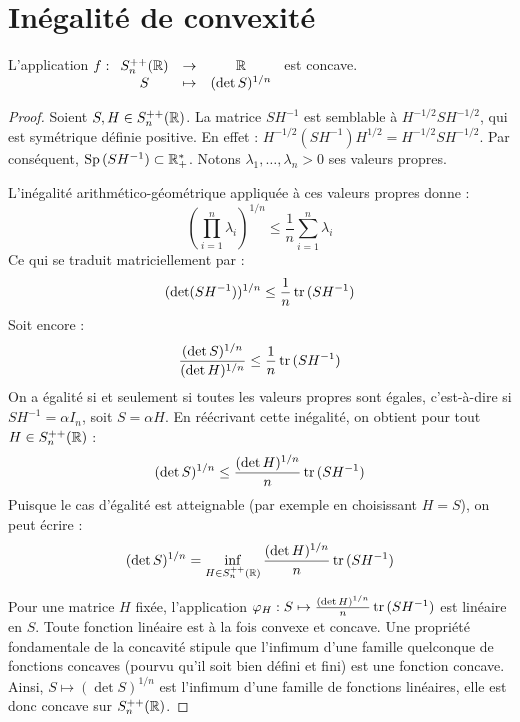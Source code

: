 \section{Inégalité de convexité}

\begin{proposition}{}{}
    L'application $f : \begin{array}[t]{ccc}
    S_n^{++}(\mathbb{R}) & \to & \mathbb{R} \\
    S & \mapsto & (\det S)^{1/n}
    \end{array}$ est concave.
\end{proposition}

\lvspace \avspace {}
\begin{proof}
    Soient $S, H \in S_n^{++}(\mathbb{R})$.
    La matrice $S H^{-1}$ est semblable à $H^{-1/2} S H^{-1/2}$, qui est symétrique définie positive.
    En effet : $H^{-1/2} (S H^{-1}) H^{1/2} = H^{-1/2} S H^{-1/2}$.
    Par conséquent, $\operatorname{Sp} \,(S H^{-1}) \subset \mathbb{R}_+^*$. Notons $\lambda_1, \dots, \lambda_n > 0$ ses valeurs propres.

    L'inégalité arithmético-géométrique appliquée à ces valeurs propres donne :
    \[ \left( \prod_{i=1}^n \lambda_i \right)^{1/n} \le \frac{1}{n} \sum_{i=1}^n \lambda_i \]
    Ce qui se traduit matriciellement par :
    \[ (\det(S H^{-1}))^{1/n} \le \frac{1}{n} \operatorname{tr} \,(S H^{-1}) \]
    Soit encore :
    \[ \frac{(\det S)^{1/n}}{(\det H)^{1/n}} \le \frac{1}{n} \operatorname{tr} \,(S H^{-1}) \]
    On a égalité si et seulement si toutes les valeurs propres sont égales, c'est-à-dire si $S H^{-1} = \alpha I_n$, soit $S = \alpha H$.
    En réécrivant cette inégalité, on obtient pour tout $H \in S_n^{++}(\mathbb{R})$ :
    \[ (\det S)^{1/n} \le \frac{(\det H)^{1/n}}{n} \operatorname{tr} \,(S H^{-1}) \]
    Puisque le cas d'égalité est atteignable (par exemple en choisissant $H = S$), on peut écrire :
    \[ (\det S)^{1/n} = \inf_{H \in S_n^{++}(\mathbb{R})} \frac{(\det H)^{1/n}}{n} \operatorname{tr} \,(S H^{-1}) \]

    Pour une matrice $H$ fixée, l'application $\varphi_H : S \mapsto \frac{(\det H)^{1/n}}{n} \operatorname{tr} \,(S H^{-1})$ est linéaire en $S$.
    Toute fonction linéaire est à la fois convexe et concave.
    Une propriété fondamentale de la concavité stipule que l'infimum d'une famille quelconque de fonctions concaves (pourvu qu'il soit bien défini et fini) est une fonction concave.
    Ainsi, $S \mapsto (\det S)^{1/n}$ est l'infimum d'une famille de fonctions linéaires, elle est donc concave sur $S_n^{++}(\mathbb{R})$.
\end{proof}